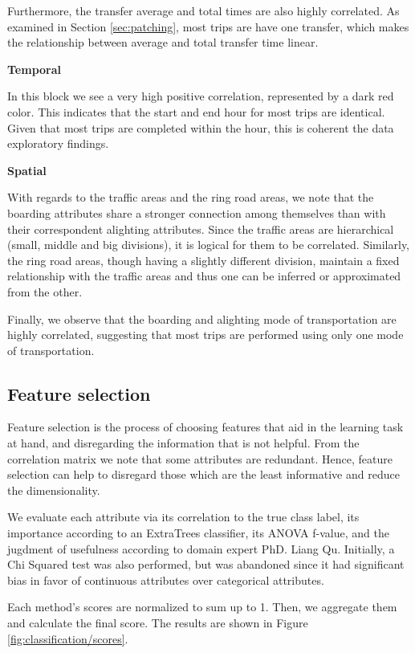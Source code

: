 \documentclass{article}
\begin{document}
Furthermore, the transfer average and total times are also highly correlated. As examined in Section \ref{sec:patching}, most trips are have one transfer, which makes the relationship between average and total transfer time linear.

\textbf{Temporal}

In this block we see a very high positive correlation, represented by a dark red color. This indicates that the start and end hour for most trips are identical. Given that most trips are completed within the hour, this is coherent the data exploratory findings. 

\textbf{Spatial}

With regards to the traffic areas and the ring road areas, we note that the boarding attributes share a stronger connection among themselves than with their correspondent alighting attributes. Since the traffic areas are hierarchical (small, middle and big divisions), it is logical for them to be correlated. Similarly, the ring road areas, though having a slightly different division, maintain a fixed relationship with the traffic areas and thus one can be inferred or approximated from the other. 

Finally, we observe that the boarding and alighting mode of transportation are highly correlated, suggesting that most trips are performed using only one mode of transportation. 

\subsection{Feature selection}
Feature selection is the process of choosing features that aid in the learning task at hand, and disregarding the information that is not helpful. From the correlation matrix we note that some attributes are redundant. Hence, feature selection can help to disregard those which are the least informative and reduce the dimensionality.

We evaluate each attribute via its correlation to the true class label, its importance according to an ExtraTrees classifier, its ANOVA f-value, and the jugdment of usefulness according to domain expert PhD. Liang Qu. Initially, a Chi Squared test was also performed, but was abandoned since it had significant bias in favor of continuous attributes over categorical attributes. 

Each method's scores are normalized to sum up to 1. Then, we aggregate them and calculate the final score. The results are shown in Figure \ref{fig:classification/scores}. 
\end{document}
